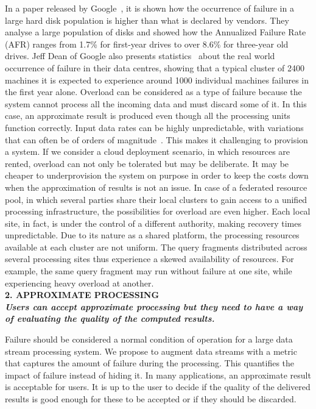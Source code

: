   In a paper released by Google~\cite{google-failure-disks}, it is shown how the occurrence of failure in
  a large hard disk population is higher than what is declared by vendors. They analyse a large
  population of disks and showed how the Annualized Failure Rate (AFR) ranges from 1.7\% for first-year
  drives to over 8.6\% for three-year old drives.
  Jeff Dean of Google also presents statistics~\cite{google-failure-talk} about the real world occurrence
  of failure in their data centres, showing that a typical cluster of 2400 machines it is expected to
  experience around 1000 individual machines failures in the first year alone. 
%   
  Overload can be considered as a type of failure because the system cannot process all the
  incoming data and must discard some of it. In this case, an approximate result is produced even
  though all the processing units function correctly.
  Input data rates can be highly unpredictable, with variations that can often be of orders of
  magnitude~\cite{load-shedding}. This makes it challenging to provision a system. 
  If we consider a cloud deployment scenario, in which resources are rented, overload can not
  only be tolerated but may be deliberate. It may be cheaper to underprovision the system on purpose in
  order to keep the costs down when the approximation of results is not an issue.  
  In case of a federated resource pool, in which several parties share their local clusters to gain access
  to a unified processing infrastructure, the possibilities for overload are even higher. Each local
  site, in fact, is under the control of a different authority, making recovery
  times unpredictable. Due to its nature as a shared platform, the processing resources available at each
  cluster are not uniform. The query fragments distributed across several processing sites thus
  experience a skewed availability of resources. For example, the same query fragment may run without failure at one
  site, while experiencing heavy overload at another.\\

\textbf{2. APPROXIMATE PROCESSING \\ \textit{Users can accept approximate processing but they need to have a
way of evaluating the quality of the computed results.}}
  
 	Failure should be considered a normal condition of operation for a large data stream processing
	system. We propose to augment data streams with a metric that captures the amount of failure during
	the processing. This quantifies the impact of failure instead of hiding it. 
	In many applications, an approximate result is acceptable for users. It is up to the user to decide if the quality
	of the delivered results is good enough for these to be accepted or if they should be discarded.
	
